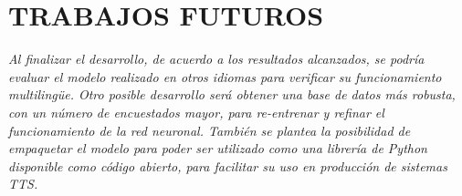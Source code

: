 \section{TRABAJOS FUTUROS}
\color{red}
\textit{Al finalizar el desarrollo, de acuerdo a los resultados alcanzados, se podría evaluar el modelo realizado en otros idiomas para verificar su funcionamiento multilingüe. Otro posible desarrollo será obtener una base de datos más robusta, con un número de encuestados mayor, para re-entrenar y refinar el funcionamiento de la red neuronal. También se plantea la posibilidad de empaquetar el modelo para poder ser utilizado como una librería de Python disponible como código abierto, para facilitar su uso en producción de sistemas TTS.} \color{black}

\newpage